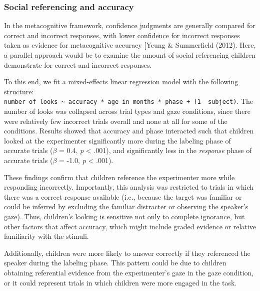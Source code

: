 \documentclass[a4paper,man,apacite,floatsintext]{apa6}
\begin{document}
\subsubsection{Social referencing and
accuracy}\label{social-referencing-and-accuracy}

In the metacognitive framework, confidence judgments are generally
compared for correct and incorrect responses, with lower confidence for
incorrect responses taken as evidence for metacognitive accuracy
{[}Yeung \& Summerfield (2012). Here, a parallel approach would be to
examine the amount of social referencing children demonstrate for
correct and incorrect responses.

To this end, we fit a mixed-effects linear regression model with the
following structure:
\texttt{number\ of\ looks\ \textasciitilde{}\ accuracy\ *\ age\ in\ months\ *\ phase\ +\ (1\ \textbar{}\ subject)}.
The number of looks was collapsed across trial types and gaze
conditions, since there were relatively few incorrect trials overall and
none at all for some of the conditions. Results showed that accuracy and
phase interacted such that children looked at the experimenter
significantly more during the labeling phase of accurate trials
(\(\beta\) = 0.4, \emph{p} \textless{} .001), and significantly less in
the \emph{response} phase of accurate trials (\(\beta\) = -1.0, \emph{p}
\textless{} .001).

These findings confirm that children reference the experimenter more
while responding incorrectly. Importantly, this analysis was restricted
to trials in which there was a correct response available (i.e., because
the target was familiar or could be inferred by excluding the familiar
distracter or observing the speaker's gaze). Thus, children's looking is
sensitive not only to complete ignorance, but other factors that affect
accuracy, which might include graded evidence or relative familiarity
with the stimuli.

Additionally, children were more likely to answer correctly if they
referenced the speaker during the labeling phase. This pattern could be
due to children obtaining referential evidence from the experimenter's
gaze in the gaze condition, or it could represent trials in which
children were more engaged in the task.
\end{document}
